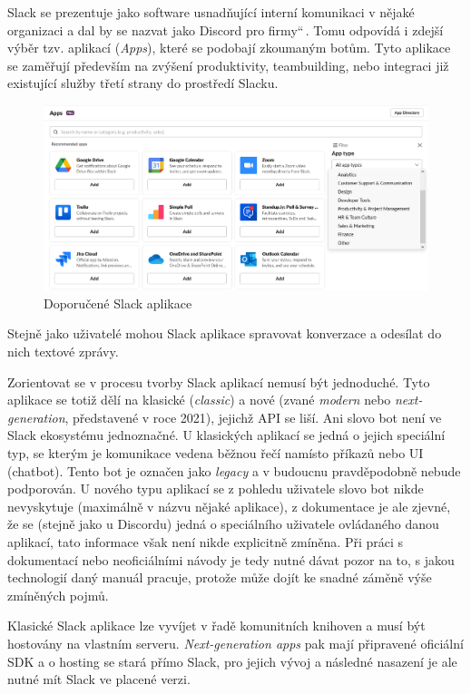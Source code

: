 \documentclass[FM]{tulthesis}
\begin{document}
	Slack se prezentuje jako software usnadňující interní komunikaci v nějaké organizaci a dal by se nazvat jako \quotedblbase Discord pro firmy\textquotedblleft\,. Tomu odpovídá i zdejší výběr tzv. aplikací (\textit{Apps}), které se podobají zkoumaným botům. Tyto aplikace se zaměřují především na zvýšení produktivity, teambuilding, nebo integraci již existující služby třetí strany do prostředí Slacku.
	
	\begin{figure}[ht]
		\centering
		\includegraphics[width=\textwidth]{img/SlackApps}
		\caption{Doporučené Slack aplikace}
	\end{figure}
	
	Stejně jako uživatelé mohou Slack aplikace spravovat konverzace a odesílat do nich textové zprávy. %
	
	Zorientovat se v procesu tvorby Slack aplikací nemusí být jednoduché. Tyto aplikace se totiž dělí na klasické (\textit{classic}) a nové (zvané \textit{modern} nebo \textit{next-generation}, představené v roce 2021), jejichž API se liší. Ani slovo bot není ve Slack ekosystému jednoznačné. U klasických aplikací se jedná o jejich speciální typ, se kterým je komunikace vedena běžnou řečí namísto příkazů nebo UI (chatbot). Tento bot je označen jako \textit{legacy} a v budoucnu pravděpodobně nebude podporován. U nového typu aplikací se z pohledu uživatele slovo bot nikde nevyskytuje (maximálně v názvu nějaké aplikace), z dokumentace je ale zjevné, že se (stejně jako u Discordu) jedná o speciálního uživatele ovládaného danou aplikací, tato informace však není nikde explicitně zmíněna. Při práci s dokumentací nebo neoficiálními návody je tedy nutné dávat pozor na to, s jakou technologií daný manuál pracuje, protože může dojít ke snadné záměně výše zmíněných pojmů.
	
	Klasické Slack aplikace lze vyvíjet v řadě komunitních knihoven a musí být hostovány na vlastním serveru. \textit{Next-generation apps} pak mají připravené oficiální SDK a o hosting se stará přímo Slack, pro jejich vývoj a následné nasazení je ale nutné mít Slack ve placené verzi.
	
\end{document}
